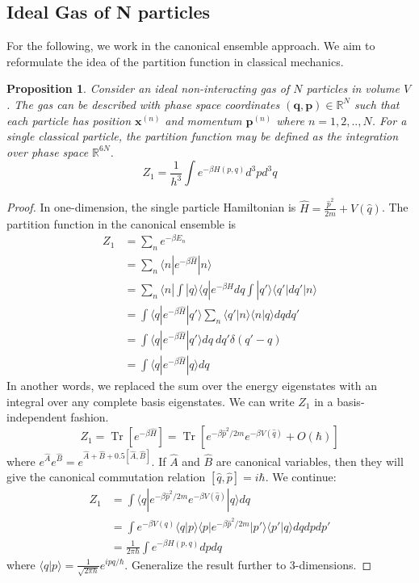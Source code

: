 \documentclass[a4paper]{article}
\DeclareMathOperator{\Tr}{Tr}
\theoremstyle{new}
\newtheorem{prop}{Proposition}[section]
\begin{document}
\subsection{Ideal Gas of N particles}
For the following, we work in the canonical ensemble approach. We aim to reformulate the idea of the partition function in classical mechanics. 
\begin{prop}
Consider an ideal non-interacting gas of $N$ particles in volume $V$. The gas can be described with phase space coordinates $(\mathbf{q},\mathbf{p})\in\mathbb{R}^N$ such that each particle has position $\mathbf{x}^{(n)}$ and momentum $\mathbf{p}^{(n)}$ where $n=1,2,..,N$. For a single classical particle, the partition function may be defined as the integration over phase space $\mathbb{R}^{6N}$. 
$$Z_1=\frac{1}{h^3}\int e^{-\beta H(p,q)}d^3pd^3q$$
\end{prop}
\begin{proof}
In one-dimension, the single particle Hamiltonian is $\hat{H}=\frac{\hat{p}^2}{2m}+V(\hat{q})$. The partition function in the canonical ensemble is
\begin{align}
    Z_1&=\sum_ne^{-\beta E_n}\nonumber\\&=\sum_n\langle n|e^{-\beta\hat{H}}|n\rangle\nonumber\\&=\sum_n\langle n|\int|q\rangle\langle q|e^{-\beta\hat{H}}dq\int|q'\rangle\langle q'|dq'|n\rangle\nonumber\\&=\int\langle q|e^{-\beta\hat{H}}|q'\rangle\sum_n\langle q'|n\rangle\langle n|q\rangle dqdq'\nonumber\\&=\int\langle q|e^{-\beta\hat{H}}|q'\rangle dq~dq'\delta(q'-q)\nonumber\\&=\int\langle q|e^{-\beta\hat{H}}|q\rangle dq\nonumber
\end{align}
In another words, we replaced the sum over the energy eigenstates with an integral over any complete basis eigenstates. We can write $Z_1$ in a basis-independent fashion.
$$Z_1=\Tr[e^{-\beta\hat{H}}]=\Tr[e^{-\beta \hat{p}^2/2m}e^{-\beta V(\hat{q})}+O(\hbar)]$$
where $e^{\hat{A}}e^{\hat{B}}=e^{\hat{A}+\hat{B}+0.5[\hat{A},\hat{B}]}$. If $\hat{A}$ and $\hat{B}$ are canonical variables, then they will give the canonical commutation relation $[\hat{q},\hat{p}]=i\hbar$. We continue:
\begin{align}
    Z_1&=\int\langle q|e^{-\beta\hat{p}^2/2m}e^{-\beta V(\hat{q})}|q\rangle dq\nonumber\\&=\int e^{-\beta V(q)}\langle q|p\rangle\langle p|e^{-\beta\hat{p}^2/2m}|p'\rangle\langle p'|q\rangle dqdpdp'\nonumber\\&=\frac{1}{2\pi\hbar}\int e^{-\beta H(p,q)}dpdq\nonumber
\end{align}
where $\langle q|p\rangle=\frac{1}{\sqrt{2\pi\hbar}}e^{ipq/\hbar}$. Generalize the result further to 3-dimensions.
\end{proof}
\end{document}
